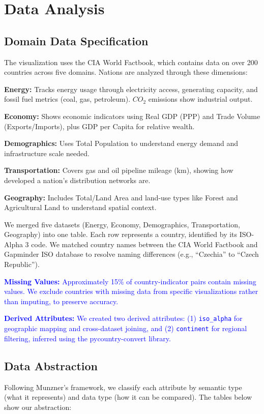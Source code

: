 \documentclass[conference]{IEEEtran}
\begin{document}
\section{Data Analysis}

\subsection{Domain Data Specification}
The visualization uses the CIA World Factbook, which contains data on over 200 countries across five domains. Nations are analyzed through these dimensions:

\textbf{Energy:} Tracks energy usage through electricity access, generating capacity, and fossil fuel metrics (coal, gas, petroleum). $CO_2$ emissions show industrial output.

\textbf{Economy:} Shows economic indicators using Real GDP (PPP) and Trade Volume (Exports/Imports), plus GDP per Capita for relative wealth.

\textbf{Demographics:} Uses Total Population to understand energy demand and infrastructure scale needed.

\textbf{Transportation:} Covers gas and oil pipeline mileage (km), showing how developed a nation's distribution networks are.

\textbf{Geography:} Includes Total/Land Area and land-use types like Forest and Agricultural Land to understand spatial context.

We merged five datasets (Energy, Economy, Demographics, Transportation, Geography) into one table. Each row represents a country, identified by its ISO-Alpha 3 code. We matched country names between the CIA World Factbook and Gapminder ISO database to resolve naming differences (e.g., ``Czechia'' to ``Czech Republic'').

\textcolor{blue}{\textbf{Missing Values:} Approximately 15\% of country-indicator pairs contain missing values. We exclude countries with missing data from specific visualizations rather than imputing, to preserve accuracy.}

\textcolor{blue}{\textbf{Derived Attributes:} We created two derived attributes: (1) \texttt{iso\_alpha} for geographic mapping and cross-dataset joining, and (2) \texttt{continent} for regional filtering, inferred using the pycountry-convert library.}

\subsection{Data Abstraction}
Following Munzner's framework, we classify each attribute by semantic type (what it represents) and data type (how it can be compared). The tables below show our abstraction:
\end{document}
